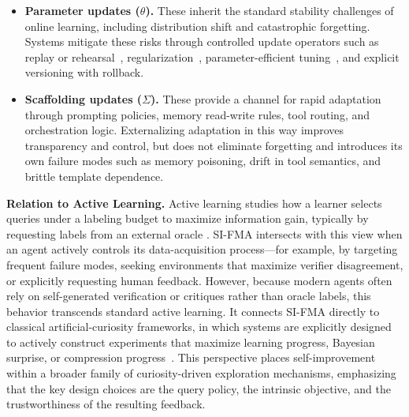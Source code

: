\begin{itemize}
    \item \textbf{Parameter updates ($\theta$).}
    These inherit the standard stability challenges of online learning, including distribution shift and catastrophic forgetting. Systems mitigate these risks through controlled update operators such as replay or rehearsal~\citep{robins1995catastrophic}, regularization~\citep{kirkpatrick2017overcoming,ramesh2026learning}, parameter-efficient tuning~\citep{hu2022lora}, and explicit versioning with rollback.

    \item \textbf{Scaffolding updates ($\Sigma$).}
    These provide a channel for rapid adaptation through prompting policies, memory read-write rules, tool routing, and orchestration logic. Externalizing adaptation in this way improves transparency and control, but does not eliminate forgetting and introduces its own failure modes such as memory poisoning, drift in tool semantics, and brittle template dependence.
\end{itemize}


\textbf{Relation to Active Learning.} Active learning studies how a learner selects queries under a labeling budget to maximize information gain, typically by requesting labels from an external oracle \citep{ren2021survey}. SI-FMA intersects with this view when an agent actively controls its data-acquisition process---for example, by targeting frequent failure modes, seeking environments that maximize verifier disagreement, or explicitly requesting human feedback. However, because modern agents often rely on self-generated verification or critiques rather than oracle labels, this behavior transcends standard active learning. It connects SI-FMA directly to classical artificial-curiosity frameworks, in which systems are explicitly designed to actively construct experiments that maximize learning progress, Bayesian surprise, or compression progress~\citep{schmidhuber1991possibility,storck1995reinforcement, schmidhuber2006developmental,schmidhuber2010formal,herrmann2026interestingness}. This perspective places self-improvement within a broader family of curiosity-driven exploration mechanisms, emphasizing that the key design choices are the query policy, the intrinsic objective, and the trustworthiness of the resulting feedback.
